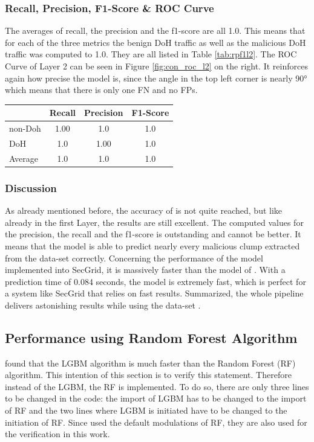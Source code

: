 \subsubsection{Recall, Precision, F1-Score \& ROC Curve}
The averages of recall, the precision and the f1-score are all 1.0. This means that for each of the three metrics the benign DoH traffic as well as the malicious DoH traffic was computed to 1.0. They are all listed in Table \ref{tab:rpf1l2}. The ROC Curve of Layer 2 can be seen in Figure \ref{fig:con_roc_l2} on the right. It reinforces again how precise the model is, since the angle in the top left corner is nearly 90° which means that there is only one FN and no FPs.

\begin{center}
\begin{longtable}{ |l|c|c|c| }
\hline
 & Recall & Precision & F1-Score \\
\hline
non-Doh & 1.00 & 1.0 & 1.0 \\
\hline
DoH & 1.0 & 1.00 & 1.0 \\
\hline
Average & 1.0 & 1.0 & 1.0 \\ 
\hline
\end{longtable}
\label{tab:rpf1l2}
\end{center}

\subsubsection{Discussion}
As already mentioned before, the accuracy of \cite{BehnkeEtAl_FeatureEngineeringMLModelMaliciusDoHTraffic} is not quite reached, but like already in the first Layer, the results are still excellent. The computed values for the precision, the recall and the f1-score is outstanding and cannot be better. It means that the model is able to predict nearly every malicious clump extracted from the data-set \cite{CIRA-CIC-DoHBrw-2020} correctly. Concerning the performance of the model implemented into SecGrid, it is massively faster than the model of \cite{BehnkeEtAl_FeatureEngineeringMLModelMaliciusDoHTraffic}. With a prediction time of 0.084 seconds, the model is extremely fast, which is perfect for a system like SecGrid that relies on fast results. Summarized, the whole pipeline delivers astonishing results while using the data-set \cite{CIRA-CIC-DoHBrw-2020}.

\subsection{Performance using Random Forest Algorithm}
\cite{BehnkeEtAl_FeatureEngineeringMLModelMaliciusDoHTraffic} found that the LGBM algorithm is much faster than the Random Forest (RF) algorithm. This intention of this section is to verify this statement. Therefore instead of the LGBM, the RF is implemented. To do so, there are only three lines to be changed in the code: the import of LGBM has to be changed to the import of RF and the two lines where LGBM is initiated have to be changed to the initiation of RF. Since \cite{BehnkeEtAl_FeatureEngineeringMLModelMaliciusDoHTraffic} used the default modulations of RF, they are also used for the verification in this work.

